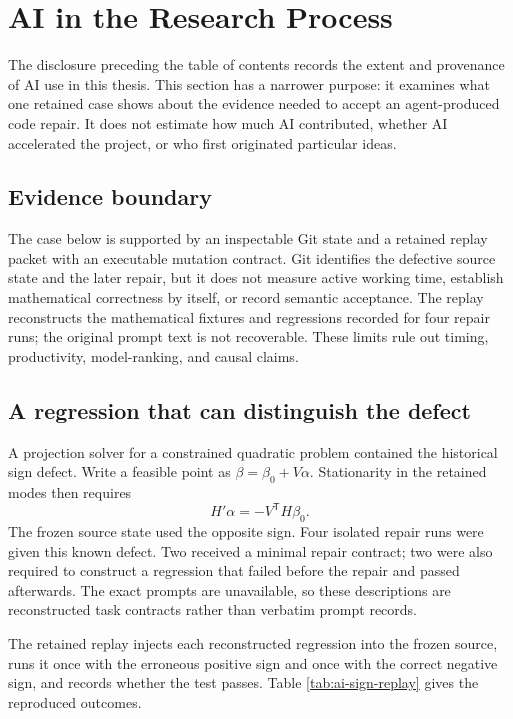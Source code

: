 \section{AI in the Research Process}\label{sec:use-of-ai}

The disclosure preceding the table of contents records the extent and
provenance of AI use in this thesis.  This section has a narrower purpose: it
examines what one retained case shows about the evidence needed to accept an
agent-produced code repair.  It does not estimate how much AI contributed,
whether AI accelerated the project, or who first originated particular ideas.

\subsection{Evidence boundary}

The case below is supported by an inspectable Git state and a retained replay
packet with an executable mutation contract.  Git identifies the defective
source state and the later repair, but it does not measure active working time,
establish mathematical correctness by itself, or record semantic acceptance.
The replay reconstructs the mathematical fixtures and regressions recorded for
four repair runs; the original prompt text is not recoverable.  These limits
rule out timing, productivity, model-ranking, and causal claims.

\subsection{A regression that can distinguish the defect}

A projection solver for a constrained quadratic problem contained the
historical sign defect.  Write a feasible point as
\(\beta=\beta_0+V\alpha\).  Stationarity in the retained modes then requires
\[
  H'\alpha=-V^{\mathsf T}H\beta_0.
\]
The frozen source state used the opposite sign.  Four isolated repair runs were
given this known defect.  Two received a minimal repair contract; two were also
required to construct a regression that failed before the repair and passed
afterwards.  The exact prompts are unavailable, so these descriptions are
reconstructed task contracts rather than verbatim prompt records.

The retained replay injects each reconstructed regression into the frozen
source, runs it once with the erroneous positive sign and once with the correct
negative sign, and records whether the test passes.  Table
\ref{tab:ai-sign-replay} gives the reproduced outcomes.

